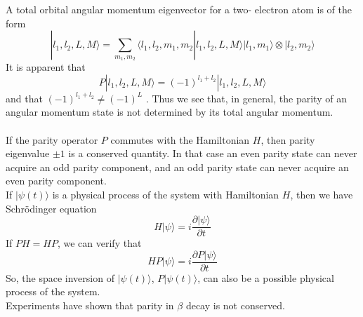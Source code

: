 \documentclass[cyan]{elegantnote}
\begin{document}
A total orbital angular momentum eigenvector for a two-
electron atom is of the form
\[|l_1,l_2,L,M\rangle = \sum_{m_1,m_2}  \langle l_1,l_2,m_1,m_2 | l_1,l_2,L,M\rangle |l_1,m_1\rangle \otimes |l_2,m_2\rangle\]
It is apparent that
\[P|l_1,l_2,L,M\rangle = (-1)^{l_1+l_2}|l_1,l_2,L,M\rangle\]
and that $(-1)^{l_1+l_2} \neq (-1)^{L}$ . Thus we see that, in general, the parity of an angular momentum state is not determined by its total angular momentum.\\ \\
If the parity operator $P$ commutes with the Hamiltonian $H$, then parity eigenvalue $\pm 1$ is a conserved quantity. In that case an even parity state can never acquire an odd parity component, and an odd parity state can never acquire an even parity component. \\
If $|\psi(t)\rangle$ is a physical process of the system with Hamiltonian $H$, then we have Schrödinger equation 
\[H|\psi\rangle = i\frac{\partial |\psi\rangle }{\partial t}\]
If $PH = HP$, we can verify that
\[H P|\psi\rangle = i\frac{\partial P |\psi\rangle }{\partial t}\]
So, the space inversion of $|\psi(t)\rangle$, $P|\psi(t)\rangle$, can also be a possible physical process of the system.\\
Experiments have shown that parity in $\beta$ decay is not conserved.
\end{document}
